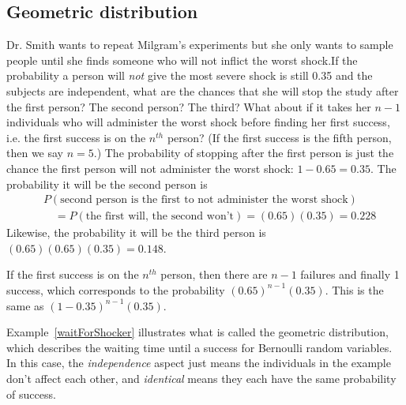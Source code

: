 
\subsection{Geometric distribution}


\begin{examplewrap}
\begin{nexample}{Dr. Smith wants to repeat Milgram's experiments but she only wants to sample people until she finds someone who will not inflict the worst shock.\footnotemark If the probability a person will \emph{not} give the most severe shock is still 0.35 and the subjects are independent, what are the chances that she will stop the study after the first person? The second person? The third? What about if it takes her $n-1$ individuals who will administer the worst shock before finding her first success, i.e. the first success is on the $n^{th}$ person? (If the first success is the fifth person, then we say $n=5$.)} \label{waitForShocker}
The probability of stopping after the first person is just the chance the first person will not administer the worst shock: $1-0.65=0.35$. The probability it will be the second person is
\begin{align*}
&P(\text{second person is the first to not administer the
    worst shock}) \\
&\quad = P(\text{the first will, the second won't})
    = (0.65)(0.35)
    = 0.228
\end{align*}
Likewise, the probability it will be the third person is $(0.65)(0.65)(0.35) = 0.148$.

If the first success is on the $n^{th}$ person, then there are $n-1$ failures and finally 1 success, which corresponds to the probability $(0.65)^{n-1}(0.35)$. This is the same as $(1-0.35)^{n-1}(0.35)$.
\end{nexample}
\end{examplewrap}

Example~\ref{waitForShocker} illustrates what is called the geometric distribution, which describes the waiting time until a success for  Bernoulli random variables. In this case, the \emph{independence} aspect just means the individuals in the example don't affect each other, and \emph{identical} means they each have the same probability of success.

